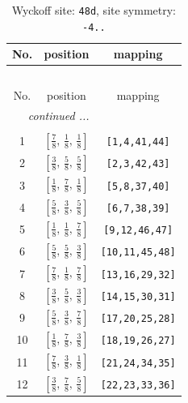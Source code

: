 \documentclass[fleqn,8pt]{jsarticle}
\begin{document}
\begin{longtable}{ccc}
\caption{Wyckoff site: {\tt 48d}, site symmetry: {\tt -4..}}
 \\
 \hline \hline
No. & position & mapping \\ \hline \endfirsthead

\multicolumn{2}{l}{\tablename\ \thetable{}} \\
 \hline \hline
No. & position & mapping \\ \hline \endhead

 \hline \hline
\multicolumn{2}{r}{\footnotesize\it continued ...} \\ \endfoot

 \hline \hline
\multicolumn{2}{r}{} \\ \endlastfoot

1 & $\left[ \frac{7}{8},\, \frac{1}{8},\, \frac{1}{8} \right]$ & {\tt [1,4,41,44]} \\ \hline
2 & $\left[ \frac{3}{8},\, \frac{5}{8},\, \frac{5}{8} \right]$ & {\tt [2,3,42,43]} \\ \hline
3 & $\left[ \frac{1}{8},\, \frac{7}{8},\, \frac{1}{8} \right]$ & {\tt [5,8,37,40]} \\ \hline
4 & $\left[ \frac{5}{8},\, \frac{3}{8},\, \frac{5}{8} \right]$ & {\tt [6,7,38,39]} \\ \hline
5 & $\left[ \frac{1}{8},\, \frac{1}{8},\, \frac{7}{8} \right]$ & {\tt [9,12,46,47]} \\ \hline
6 & $\left[ \frac{5}{8},\, \frac{5}{8},\, \frac{3}{8} \right]$ & {\tt [10,11,45,48]} \\ \hline
7 & $\left[ \frac{7}{8},\, \frac{1}{8},\, \frac{7}{8} \right]$ & {\tt [13,16,29,32]} \\ \hline
8 & $\left[ \frac{3}{8},\, \frac{5}{8},\, \frac{3}{8} \right]$ & {\tt [14,15,30,31]} \\ \hline
9 & $\left[ \frac{5}{8},\, \frac{3}{8},\, \frac{7}{8} \right]$ & {\tt [17,20,25,28]} \\ \hline
10 & $\left[ \frac{1}{8},\, \frac{7}{8},\, \frac{3}{8} \right]$ & {\tt [18,19,26,27]} \\ \hline
11 & $\left[ \frac{7}{8},\, \frac{3}{8},\, \frac{1}{8} \right]$ & {\tt [21,24,34,35]} \\ \hline
12 & $\left[ \frac{3}{8},\, \frac{7}{8},\, \frac{5}{8} \right]$ & {\tt [22,23,33,36]} \\
\end{longtable}
\renewcommand{\arraystretch}{1.2}
\end{document}
